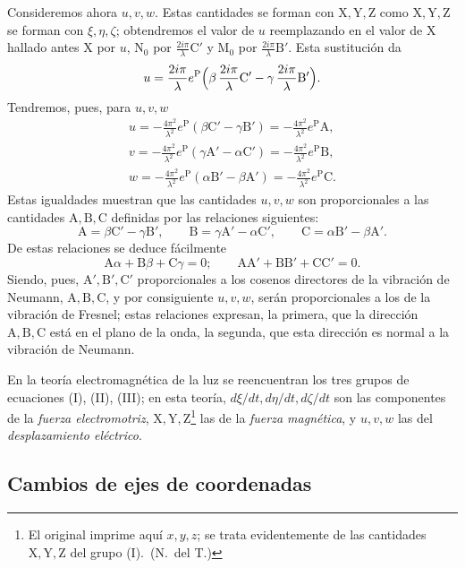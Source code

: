 Consideremos ahora $u,v,w$. Estas cantidades se forman con $\mathrm
X,\mathrm Y,\mathrm Z$ como $\mathrm X,\mathrm Y,\mathrm Z$ se forman con
$\xi,\eta,\zeta$; obtendremos el valor de $u$ reemplazando en el valor de
$\mathrm X$ hallado antes $\mathrm X$ por $u$, $\mathrm N_0$ por
$\frac{2i\pi}{\lambda}\mathrm C'$ y $\mathrm M_0$ por
$\frac{2i\pi}{\lambda}\mathrm B'$. Esta sustitución da
\[
u=\frac{2i\pi}{\lambda}e^{\mathrm P}\Bigl(\beta\,\frac{2i\pi}{\lambda}\mathrm C'-\gamma\,\frac{2i\pi}{\lambda}\mathrm B'\Bigr).
\]
Tendremos, pues, para $u,v,w$
\begin{gather*}
u=-\frac{4\pi^2}{\lambda^2}e^{\mathrm P}(\beta\mathrm C'-\gamma\mathrm B')=-\frac{4\pi^2}{\lambda^2}e^{\mathrm P}\mathrm A,\\
v=-\frac{4\pi^2}{\lambda^2}e^{\mathrm P}(\gamma\mathrm A'-\alpha\mathrm C')=-\frac{4\pi^2}{\lambda^2}e^{\mathrm P}\mathrm B,\\
w=-\frac{4\pi^2}{\lambda^2}e^{\mathrm P}(\alpha\mathrm B'-\beta\mathrm A')=-\frac{4\pi^2}{\lambda^2}e^{\mathrm P}\mathrm C.
\end{gather*}
Estas igualdades muestran que las cantidades $u,v,w$ son proporcionales a
las cantidades $\mathrm A,\mathrm B,\mathrm C$ definidas por las relaciones
siguientes:
\[
\mathrm A=\beta\mathrm C'-\gamma\mathrm B',\qquad
\mathrm B=\gamma\mathrm A'-\alpha\mathrm C',\qquad
\mathrm C=\alpha\mathrm B'-\beta\mathrm A'.
\]
De estas relaciones se deduce fácilmente
\[
\mathrm A\alpha+\mathrm B\beta+\mathrm C\gamma=0;\qquad
\mathrm{AA}'+\mathrm{BB}'+\mathrm{CC}'=0.
\]
Siendo, pues, $\mathrm A',\mathrm B',\mathrm C'$ proporcionales a los
cosenos directores de la vibración de Neumann, $\mathrm A,\mathrm
B,\mathrm C$, y por consiguiente $u,v,w$, serán proporcionales a los de la
vibración de Fresnel; estas relaciones expresan, la primera, que la
dirección $\mathrm A,\mathrm B,\mathrm C$ está en el plano de la onda, la
segunda, que esta dirección es normal a la vibración de Neumann.

En la teoría electromagnética de la luz se reencuentran los tres grupos
de ecuaciones (I), (II), (III); en esta teoría, $d\xi/dt,d\eta/dt,d\zeta/dt$
son las componentes de la \emph{fuerza electromotriz}, $\mathrm X,\mathrm Y,\mathrm Z$\footnote{El original imprime aquí $x,y,z$; se trata evidentemente de las cantidades $\mathrm X,\mathrm Y,\mathrm Z$ del grupo (I).~(N.~del T.)} las de la
\emph{fuerza magnética}, y $u,v,w$ las del \emph{desplazamiento eléctrico}.

\subsection{Cambios de ejes de coordenadas}

